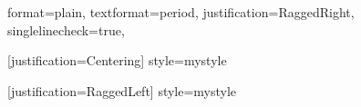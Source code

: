 \makeglossaries %
\makeindex      %

\renewcommand{\labelitemi}{\textendash} %





\newcommand*{\monthname}[1]{%
  \ifcase#1
  \or
  jan.%
  \or
  fev.%
  \or
  mar.%
  \or
  abr.%
  \or
  maio%
  \or
  jun.%
  \or
  jul.%
  \or
  ago.%
  \or
  set.%
  \or
  oct.%
  \or
  nov.%
  \or
  dez.%
  \fi
}

\newcommand{\removezero}[1]{%
\StrMid{#1}{1}{1}[\zero]%
\StrMid{#1}{2}{3}[\inte]%
\ifthenelse{\equal{0}{\zero}}{\inte}{#1}%
}
\newcommand{\usedate}[1]{%
\def\x{#1}%
\setsepchar[.]{-}%
\readlist\datee{\x}%
{\removezero{\datee[2]} \monthname{\datee[3]} \datee[1]}%
}

  {format=plain,%
    textformat=period,
    justification=RaggedRight,
    singlelinecheck=true,
  }%

  [justification=Centering]%
  {style=mystyle}%

  [justification=RaggedLeft]%
  {style=mystyle}%

\newcommand{\subsubsectionm}[1]{\subsubsection{\underline{#1}}}